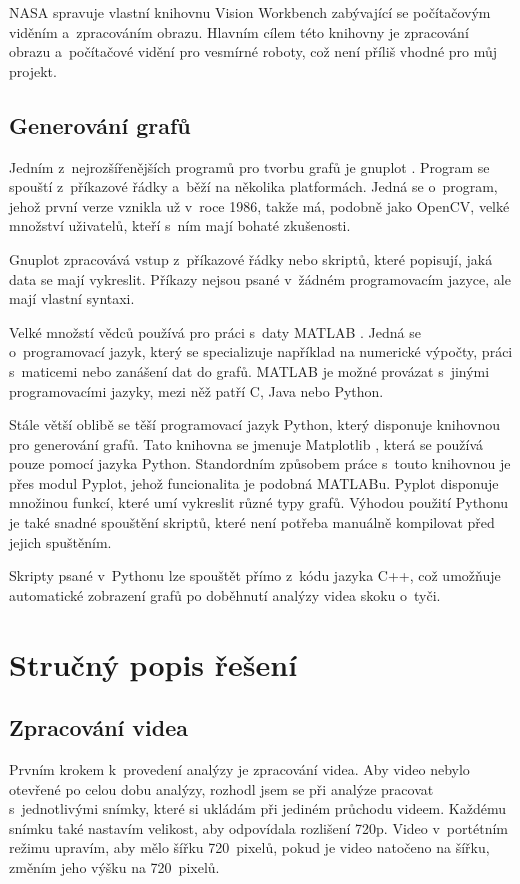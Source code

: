 NASA spravuje vlastní knihovnu Vision Workbench zabývající se počítačovým viděním a~zpracováním obrazu. Hlavním cílem této knihovny je zpracování obrazu a~počítačové vidění pro vesmírné roboty, což není příliš vhodné pro můj projekt.

\subsection{Generování grafů}

Jedním z~nejrozšířenějších programů pro tvorbu grafů je gnuplot \citep{gnuplot}. Program se spouští z~příkazové řádky a~běží na několika platformách. Jedná se o~program, jehož první verze vznikla už v~roce 1986, takže má, podobně jako OpenCV, velké množství uživatelů, kteří s~ním mají bohaté zkušenosti.

Gnuplot zpracovává vstup z~příkazové řádky nebo skriptů, které popisují, jaká data se mají vykreslit. Příkazy nejsou psané v~žádném programovacím jazyce, ale mají vlastní syntaxi.

Velké množstí vědců používá pro práci s~daty MATLAB \citep{MATLAB}. Jedná se o~programovací jazyk, který se specializuje například na numerické výpočty, práci s~maticemi nebo zanášení dat do grafů. MATLAB je možné provázat s~jinými programovacími jazyky, mezi něž patří C, Java nebo Python.

Stále větší oblibě se těší programovací jazyk Python, který disponuje knihovnou pro generování grafů. Tato knihovna se jmenuje Matplotlib \citep{Matplotlib}, která se používá pouze pomocí jazyka Python. Standordním způsobem práce s~touto knihovnou je přes modul Pyplot, jehož funcionalita je podobná MATLABu. Pyplot disponuje množinou funkcí, které umí vykreslit různé typy grafů. Výhodou použití Pythonu je také snadné spouštění skriptů, které není potřeba manuálně kompilovat před jejich spuštěním.

Skripty psané v~Pythonu lze spouštět přímo z~kódu jazyka C++, což umožňuje automatické zobrazení grafů po doběhnutí analýzy videa skoku o~tyči.

\section{Stručný popis řešení}

\subsection{Zpracování videa}

Prvním krokem k~provedení analýzy je zpracování videa. Aby video nebylo otevřené po celou dobu analýzy, rozhodl jsem se při analýze pracovat s~jednotlivými snímky, které si ukládám při jediném průchodu videem. Každému snímku také nastavím velikost, aby odpovídala rozlišení 720p. Video v~portétním režimu upravím, aby mělo šířku 720~pixelů, pokud je video natočeno na šířku, změním jeho výšku na 720~pixelů.

